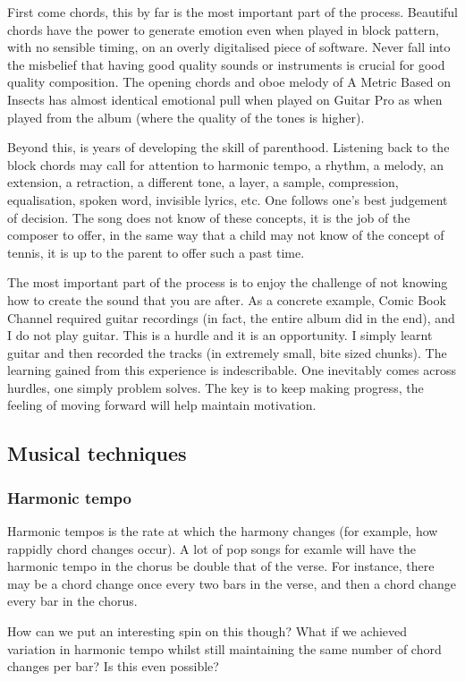 \documentclass[12pt]{book}
\theoremstyle{plain}
\theoremstyle{definition}
\begin{document}
First come chords, this by far is the most important part of the process. Beautiful chords have the power to generate emotion even when played in block pattern, with no sensible timing, on an overly digitalised piece of software. Never fall into the misbelief that having good quality sounds or instruments is crucial for good quality composition. The opening chords and oboe melody of A Metric Based on Insects has almost identical emotional pull when played on Guitar Pro as when played from the album (where the quality of the tones is higher).

Beyond this, is years of developing the skill of parenthood. Listening back to the block chords may call for attention to harmonic tempo, a rhythm, a melody, an extension, a retraction, a different tone, a layer, a sample, compression, equalisation, spoken word, invisible lyrics, etc. One follows one’s best judgement of decision. The song does not know of these concepts, it is the job of the composer to offer, in the same way that a child may not know of the concept of tennis, it is up to the parent to offer such a past time.

The most important part of the process is to enjoy the challenge of not knowing how to create the sound that you are after. As a concrete example, Comic Book Channel required guitar recordings (in fact, the entire album did in the end), and I do not play guitar. This is a hurdle and it is an opportunity. I simply learnt guitar and then recorded the tracks (in extremely small, bite sized chunks). The learning gained from this experience is indescribable. One inevitably comes across hurdles, one simply problem solves. The key is to keep making progress, the feeling of moving forward will help maintain motivation.

\subsection{Musical techniques}
\subsubsection{Harmonic tempo}
Harmonic tempos is the rate at which the harmony changes (for example, how rappidly chord changes occur). A lot of pop songs for examle will have the harmonic tempo in the chorus be double that of the verse. For instance, there may be a chord change once every two bars in the verse, and then a chord change every bar in the chorus.

How can we put an interesting spin on this though? What if we achieved variation in harmonic tempo whilst still maintaining the same number of chord changes per bar? Is this even possible?
\end{document}
